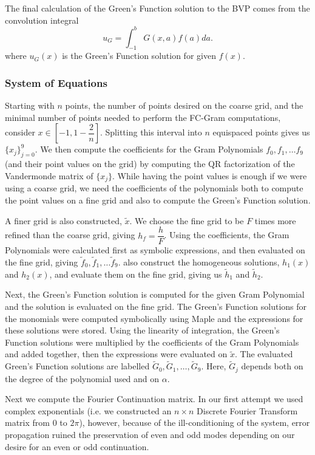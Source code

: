 \documentclass[11pt]{amsart}
\begin{document}
The final calculation of the Green's Function solution to the BVP comes from the convolution integral
\begin{equation}
u_G=\int_{-1}^b G(x,a)f(a)da.
\end{equation}
where $u_G(x)$ is the Green's Function solution for given $f(x)$.

\subsubsection{System of Equations}

Starting with $n$ points, the number of points desired on the coarse grid, and the minimal number of points needed to perform the FC-Gram computations, consider $x \in [-1, 1-\dfrac{2}{n}]$.  Splitting this interval into $n$ equispaced points gives us $\{x_j\}_{j=0}^9$.  We then compute the coefficients for the Gram Polynomials $f_0,f_1,\ldots f_9$(and their point values on the grid) by computing the QR factorization of the Vandermonde matrix of $\{x_j\}$.  While having the point values is enough if we were using a coarse grid, we need the coefficients of the polynomials both to compute the point values on a fine grid and also to compute the Green's Function solution.  


A finer grid is also constructed, $\tilde{x}$.  We choose the fine grid to be $F$ times more refined than the coarse grid, giving $h_f=\dfrac{h}{F}$.  Using the coefficients, the Gram Polynomials were calculated first as symbolic expressions, and then evaluated on the fine grid, giving  $\tilde{f}_0,\tilde{f}_1,\ldots \tilde{f}_9 $.  also construct the homogeneous solutions, $h_1(x)$ and $h_2(x)$, and evaluate them on the fine grid, giving us $\tilde{h}_1$ and $\tilde{h}_2$.  

Next, the Green's Function solution is computed for the given Gram Polynomial and the solution is evaluated on the fine grid. The Green's Function solutions for the monomials were computed symbolically using Maple and the expressions for these solutions were stored.  Using the linearity of integration, the Green's Function solutions were multiplied by the coefficients of the Gram Polynomials and added together,  then  the expressions were evaluated on $\tilde{x}$.  The evaluated Green's Function solutions are labelled  $\tilde{G}_0,\tilde{G}_1,\ldots,\tilde{G}_9$.  Here, $\tilde{G}_j$ depends both on the degree of the polynomial used and on $\alpha$. 

Next we compute the Fourier Continuation matrix.  In our first attempt we used complex exponentials (i.e. we constructed an $n \times n$ Discrete Fourier Transform matrix from $0$ to $2\pi$), however, because of the ill-conditioning of the system, error propagation ruined the preservation of even and odd modes depending on our desire for an even or odd continuation.  
\end{document}
